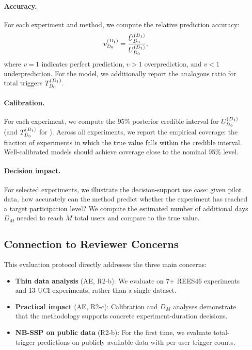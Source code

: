 \paragraph{Accuracy.}
For each experiment and method, we compute the relative
prediction accuracy:
\[
  v_{D_0}^{(D_1)}
  = \frac{\hat{U}_{D_0}^{(D_1)}}{U_{D_0}^{(D_1)}},
\]
where $v = 1$ indicates perfect prediction, $v > 1$ overprediction,
and $v < 1$ underprediction.
For the \nbmodel{} model, we additionally report the analogous
ratio for total triggers $T_{D_0}^{(D_1)}$.

\paragraph{Calibration.}
For each experiment, we compute the 95\% posterior credible
interval for $U_{D_0}^{(D_1)}$ (and $T_{D_0}^{(D_1)}$ for \nbmodel).
Across all experiments, we report the empirical coverage:
the fraction of experiments in which the true value falls
within the credible interval.
Well-calibrated models should achieve coverage close to the
nominal 95\% level.

\paragraph{Decision impact.}
For selected experiments, we illustrate the decision-support
use case: given pilot data, how accurately can the method
predict whether the experiment has reached a target
participation level?
We compute the estimated number of additional days $D_M$
needed to reach $M$ total users and compare to the true value.

\subsection{Connection to Reviewer Concerns}

This evaluation protocol directly addresses the three main
concerns:
\begin{itemize}[leftmargin=*]
  \item \textbf{Thin data analysis} (AE, R2-b):
        We evaluate on 7+ REES46 experiments and 13 UCI experiments,
        rather than a single dataset.
  \item \textbf{Practical impact} (AE, R2-c):
        Calibration and $D_M$ analyses demonstrate that the
        methodology supports concrete experiment-duration decisions.
  \item \textbf{NB-SSP on public data} (R2-b):
        For the first time, we evaluate total-trigger predictions
        on publicly available data with per-user trigger counts.
\end{itemize}

